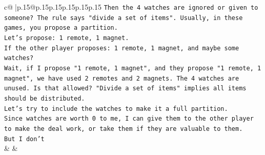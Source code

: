 \documentclass{article}
\begin{document}
{\begin{supertabular}{c@{$\;$}|p{.15\linewidth}@{}p{.15\linewidth}p{.15\linewidth}p{.15\linewidth}p{.15\linewidth}p{.15\linewidth}}
{{{\texttt{Then the 4 watches are ignored or given to someone? The rule says "divide a set of items". Usually, in these games, you propose a partition.} \\
\texttt{Let's propose: 1 remote, 1 magnet.} \\
\texttt{If the other player proposes: 1 remote, 1 magnet, and maybe some watches?} \\
\texttt{Wait, if I propose "1 remote, 1 magnet", and they propose "1 remote, 1 magnet", we have used 2 remotes and 2 magnets. The 4 watches are unused. Is that allowed? "Divide a set of items" implies all items should be distributed.} \\
\texttt{Let's try to include the watches to make it a full partition.} \\
\texttt{Since watches are worth 0 to me, I can give them to the other player to make the deal work, or take them if they are valuable to them.} \\
\texttt{But I don't} \\
            }
        }
    }
    & & \\ \\


\end{supertabular}}
\end{document}
